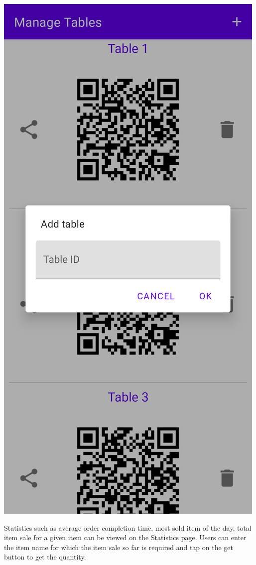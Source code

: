 \documentclass{article}
\begin{document}
\begin{center}
\includegraphics[scale=0.15]{add-table}
\end{center}

\newpage
Statistics such as average order completion time, most sold item of the day, total item sale for a given item can be viewed on the Statistics page. Users can enter the item name for which the item sale so far is required and tap on the get button to get the quantity. 
\end{document}

